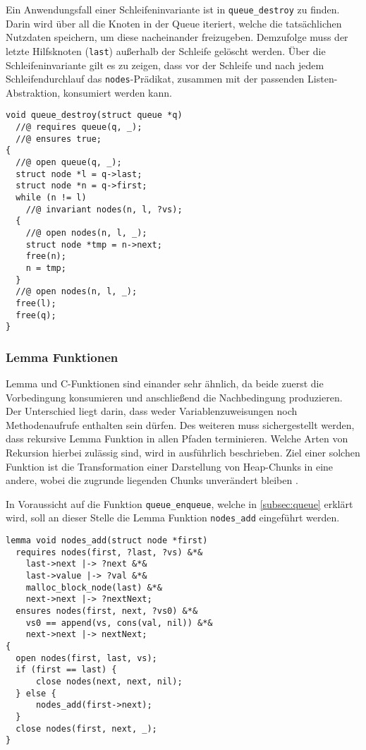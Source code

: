 \noindent
Ein Anwendungsfall einer Schleifeninvariante ist in \texttt{queue\_destroy} zu finden. Darin wird über all die Knoten in der Queue iteriert, welche die tatsächlichen Nutzdaten speichern, um diese nacheinander freizugeben. Demzufolge muss der letzte Hilfsknoten (\texttt{last}) außerhalb der Schleife gelöscht werden. Über die Schleifeninvariante gilt es zu zeigen, dass vor der Schleife und nach jedem Schleifendurchlauf das \texttt{nodes}-Prädikat, zusammen mit der passenden Listen-Abstraktion, konsumiert werden kann. 

\begin{lstlisting}
void queue_destroy(struct queue *q)
  //@ requires queue(q, _);
  //@ ensures true;
{
  //@ open queue(q, _);
  struct node *l = q->last;
  struct node *n = q->first;
  while (n != l)
    //@ invariant nodes(n, l, ?vs);
  {
    //@ open nodes(n, l, _);
    struct node *tmp = n->next;
    free(n);
    n = tmp;
  }
  //@ open nodes(n, l, _);
  free(l);
  free(q);
}
\end{lstlisting}

\subsubsection{Lemma Funktionen}
\label{subsubsec:lemma}

Lemma und C-Funktionen sind einander sehr ähnlich, da beide zuerst die Vorbedingung konsumieren und anschließend die Nachbedingung produzieren. Der Unterschied liegt darin, dass weder Variablenzuweisungen noch Methodenaufrufe enthalten sein dürfen. Des weiteren muss sichergestellt werden, dass rekursive Lemma Funktion in allen Pfaden terminieren. Welche Arten von Rekursion hierbei zulässig sind, wird in \cite[S. 22]{Jacobs2017} ausführlich beschrieben. Ziel einer solchen Funktion ist die Transformation einer Darstellung von Heap-Chunks in eine andere, wobei die zugrunde liegenden Chunks unverändert bleiben \cite{Jacobs2010}.

In Voraussicht auf die Funktion \texttt{queue\_enqueue}, welche in \cref{subsec:queue} erklärt wird, soll an dieser Stelle die Lemma Funktion \texttt{nodes\_add} eingeführt werden.

\begin{lstlisting}
lemma void nodes_add(struct node *first)
  requires nodes(first, ?last, ?vs) &*&
    last->next |-> ?next &*&
    last->value |-> ?val &*&
    malloc_block_node(last) &*&
    next->next |-> ?nextNext;
  ensures nodes(first, next, ?vs0) &*&
    vs0 == append(vs, cons(val, nil)) &*&
    next->next |-> nextNext;
{
  open nodes(first, last, vs);
  if (first == last) {
      close nodes(next, next, nil);
  } else {
      nodes_add(first->next);
  }
  close nodes(first, next, _);
}
\end{lstlisting}

